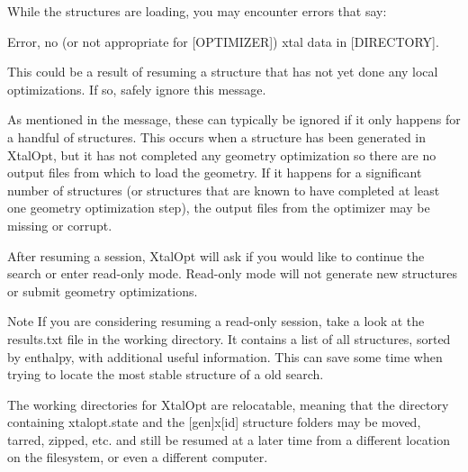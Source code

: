While the structures are loading, you may encounter errors that say\-:

\begin{DoxyVerb}Error, no (or not appropriate for [OPTIMIZER]) xtal data in [DIRECTORY].

This could be a result of resuming a structure that has not yet done
any local optimizations. If so, safely ignore this message.
\end{DoxyVerb}


As mentioned in the message, these can typically be ignored if it only happens for a handful of structures. This occurs when a structure has been generated in Xtal\-Opt, but it has not completed any geometry optimization so there are no output files from which to load the geometry. If it happens for a significant number of structures (or structures that are known to have completed at least one geometry optimization step), the output files from the optimizer may be missing or corrupt.

After resuming a session, Xtal\-Opt will ask if you would like to continue the search or enter read-\/only mode. Read-\/only mode will not generate new structures or submit geometry optimizations.

\begin{DoxyNote}{Note}
If you are considering resuming a read-\/only session, take a look at the results.\-txt file in the working directory. It contains a list of all structures, sorted by enthalpy, with additional useful information. This can save some time when trying to locate the most stable structure of a old search.
\end{DoxyNote}
The working directories for Xtal\-Opt are relocatable, meaning that the directory containing xtalopt.\-state and the \mbox{[}gen\mbox{]}x\mbox{[}id\mbox{]} structure folders may be moved, tarred, zipped, etc. and still be resumed at a later time from a different location on the filesystem, or even a different computer. 